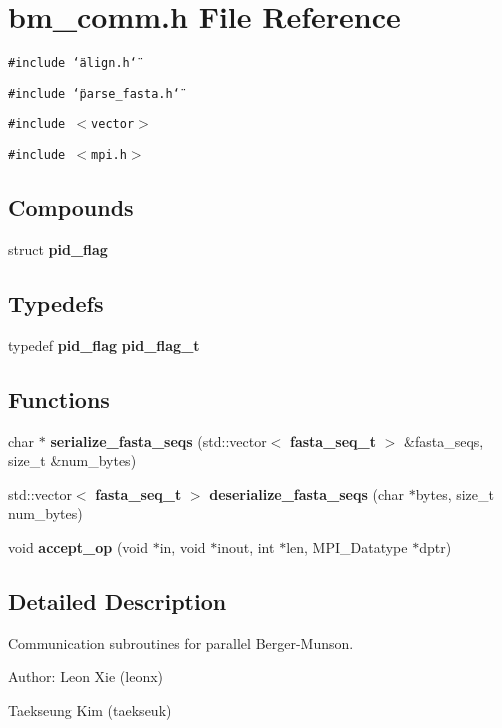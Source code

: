 \section{bm\_\-comm.h File Reference}
\label{bm__comm_8h}
{\tt \#include \char`\"{}align.h\char`\"{}}\par
{\tt \#include \char`\"{}parse\_\-fasta.h\char`\"{}}\par
{\tt \#include $<$vector$>$}\par
{\tt \#include $<$mpi.h$>$}\par
\subsection*{Compounds}
\begin{CompactItemize}
\item 
struct {\bf pid\_\-flag}
\end{CompactItemize}
\subsection*{Typedefs}
\begin{CompactItemize}
\item 
typedef {\bf pid\_\-flag} {\bf pid\_\-flag\_\-t}
\end{CompactItemize}
\subsection*{Functions}
\begin{CompactItemize}
\item 
char $\ast$ {\bf serialize\_\-fasta\_\-seqs} (std::vector$<$ {\bf fasta\_\-seq\_\-t} $>$ \&fasta\_\-seqs, size\_\-t \&num\_\-bytes)
\item 
std::vector$<$ {\bf fasta\_\-seq\_\-t} $>$ {\bf deserialize\_\-fasta\_\-seqs} (char $\ast$bytes, size\_\-t num\_\-bytes)
\item 
void {\bf accept\_\-op} (void $\ast$in, void $\ast$inout, int $\ast$len, MPI\_\-Datatype $\ast$dptr)
\end{CompactItemize}


\subsection{Detailed Description}
Communication subroutines for parallel Berger-Munson. \begin{Desc}
\item[Author:]Leon Xie (leonx) 

Taekseung Kim (taekseuk)\end{Desc}


